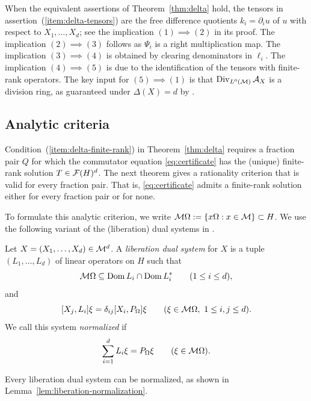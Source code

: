 \begin{remark}
When the equivalent assertions of Theorem~\ref{thm:delta} hold, the tensors in assertion~\textup{(\ref{item:delta-tensors})} are the free difference quotients $k_i=\partial_i u$ of $u$ with respect to $X_1,\ldots,X_d$;
see the implication $(1)\implies(2)$ in its proof.
The implication $(2)\implies(3)$ follows as $\Psi_i$ is a right multiplication map.
The implication $(3)\implies(4)$ is obtained by clearing denominators in $\ell_i$.
The implication $(4)\implies(5)$ is due to the identification of the tensors with finite-rank operators.
The key input for $(5)\implies(1)$ is that $\operatorname{Div}_{L^0(\mathcal M)}\mathcal A_X$ is a division ring, as guaranteed under $\Delta(X)=d$ by \cite[Theorem~1.1]{MSY23}.
\end{remark}

\subsection{Analytic criteria}
Condition~\textup{(\ref{item:delta-finite-rank})} in Theorem~\ref{thm:delta} requires a fraction pair $Q$ for which the commutator equation \eqref{eq:certificate} has the (unique) finite-rank solution $T\in\mathcal F(H)^d$.
The next theorem gives a rationality criterion that is valid for every fraction pair.
That is, \eqref{eq:certificate} admits a finite-rank solution either for every fraction pair or for none.

To formulate this analytic criterion, we write $\mathcal M\Omega:=\{x\Omega:x\in\mathcal M\}\subset H$.
We use the following variant of the (liberation) dual systems in \cite[Definition~13.1]{Voi99}.
\begin{definition}\label{def:liberation-dual-system}
Let $X=(X_1,\ldots,X_d)\in\mathcal M^d$.
A \emph{liberation dual system} for $X$ is a tuple $(L_1,\ldots,L_d)$ of linear operators on $H$ such that
\[
 \mathcal M\Omega\subseteq\operatorname{Dom} L_i\cap\operatorname{Dom} L_i^*
 \qquad(1\leq i\leq d),
\]
and
\[
 [X_j,L_i]\xi=\delta_{ij}[X_i,P_\Omega]\xi
 \qquad(\xi\in\mathcal M\Omega,\ 1\leq i,j\leq d).
\]
We call this system \emph{normalized} if
\begin{equation}\label{eq:liberation-normalization}
 \sum_{i=1}^dL_i\xi=P_\Omega\xi
 \qquad(\xi\in\mathcal M\Omega).
\end{equation}
\end{definition}
Every liberation dual system can be normalized, as shown in Lemma~\ref{lem:liberation-normalization}.

